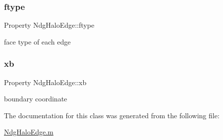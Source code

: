 \subsubsection{\texorpdfstring{ftype}{ftype}}
{\footnotesize\ttfamily Property Ndg\+Halo\+Edge\+::ftype\hspace{0.3cm}{\ttfamily [protected]}}



face type of each edge 

\mbox{\label{class_ndg_halo_edge_a4e5f166c93fe75eca1e2bb24a52d7879}} 
\subsubsection{\texorpdfstring{xb}{xb}}
{\footnotesize\ttfamily Property Ndg\+Halo\+Edge\+::xb\hspace{0.3cm}{\ttfamily [protected]}}



boundary coordinate 



The documentation for this class was generated from the following file\+:\begin{DoxyCompactItemize}
\item 
\hyperlink{_ndg_halo_edge_8m}{Ndg\+Halo\+Edge.\+m}\end{DoxyCompactItemize}
